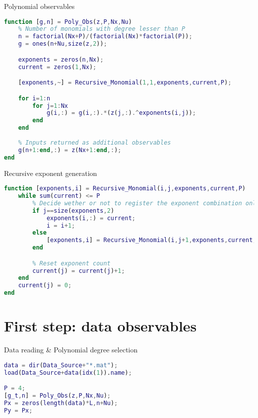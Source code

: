 \documentclass{beamer}
\begin{document}
\begin{frame}[fragile]{Polynomial observables}
    \begin{lstlisting}[language=Matlab,basicstyle=\tiny]
function [g,n] = Poly_Obs(z,P,Nx,Nu)
    % Number of monomials with degree lesser than P
    n = factorial(Nx+P)/(factorial(Nx)*factorial(P));
    g = ones(n+Nu,size(z,2));

    exponents = zeros(n,Nx);
    current = zeros(1,Nx);

    [exponents,~] = Recursive_Monomial(1,1,exponents,current,P);

    for i=1:n
        for j=1:Nx
            g(i,:) = g(i,:).*(z(j,:).^exponents(i,j));
        end
    end
    
    % Inputs returned as additional observables
    g(n+1:end,:) = z(Nx+1:end,:);
end
    \end{lstlisting}
\end{frame}

\begin{frame}[fragile]{Recursive exponent generation}
    \begin{lstlisting}[language=Matlab,basicstyle=\tiny]
function [exponents,i] = Recursive_Monomial(i,j,exponents,current,P)
    while sum(current) <= P
        % Decide wether or not to register the exponent combination only on the deepest level of recursion
        if j==size(exponents,2)
            exponents(i,:) = current;
            i = i+1;
        else
            [exponents,i] = Recursive_Monomial(i,j+1,exponents,current,P);
        end

        % Reset exponent count
        current(j) = current(j)+1;
    end
    current(j) = 0;
end
    \end{lstlisting}
\end{frame}


\section{First step: data observables}

\begin{frame}[fragile]{Data reading \& Polynomial degree selection}
    \begin{lstlisting}[language=Matlab]
data = dir(Data_Source+"*.mat");
load(Data_Source+data(idx(1)).name);

P = 4;
[g_t,n] = Poly_Obs(z,P,Nx,Nu);
Px = zeros(length(data)*L,n+Nu);
Py = Px;
    \end{lstlisting}
\end{frame}
\end{document}
